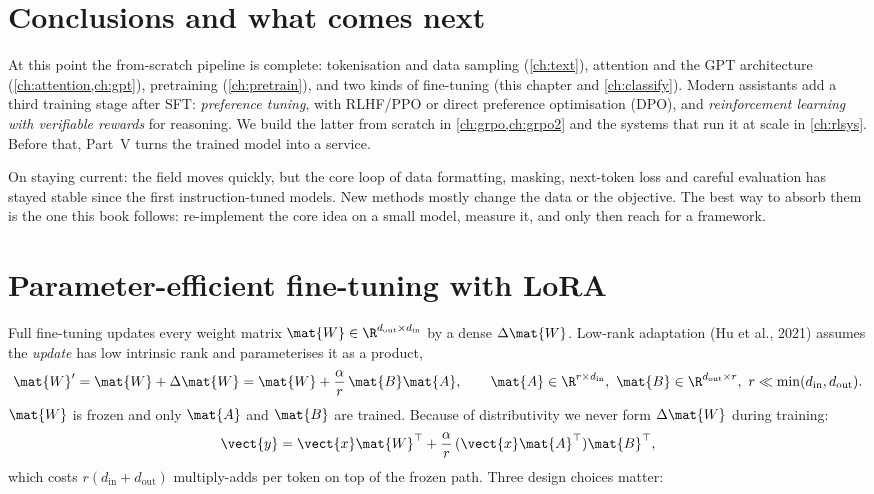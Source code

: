 \section{Conclusions and what comes next}\label{sec:instruct:conclusions}

At this point the from-scratch pipeline is complete: tokenisation and data sampling
(\cref{ch:text}), attention and the GPT architecture (\cref{ch:attention,ch:gpt}),
pretraining (\cref{ch:pretrain}), and two kinds of fine-tuning (this chapter and
\cref{ch:classify}). Modern assistants add a third training stage after SFT:
\emph{preference tuning}, with RLHF/PPO or direct preference optimisation (DPO), and
\emph{reinforcement learning with verifiable rewards} for reasoning. We build the
latter from scratch in \cref{ch:grpo,ch:grpo2} and the systems that run it at scale in
\cref{ch:rlsys}. Before that, Part~V turns the trained model into a service.

On staying current: the field moves quickly, but the core loop of data formatting,
masking, next-token loss and careful evaluation has stayed stable since the first
instruction-tuned models. New methods mostly change the data or the objective. The
best way to absorb them is the one this book follows: re-implement the core idea on a
small model, measure it, and only then reach for a framework.

\section{Parameter-efficient fine-tuning with LoRA}\label{sec:instruct:lora}

Full fine-tuning updates every weight matrix $\mat{W}\in\R^{d_\text{out}\times d_\text{in}}$
by a dense $\Delta\mat{W}$. Low-rank adaptation (Hu et al., 2021) assumes the
\emph{update} has low intrinsic rank and parameterises it as a product,
\begin{equation}
\mat{W}' = \mat{W} + \Delta\mat{W} = \mat{W} + \frac{\alpha}{r}\,\mat{B}\mat{A},\qquad
\mat{A}\in\R^{r\times d_\text{in}},\ \mat{B}\in\R^{d_\text{out}\times r},\ r\ll\min(d_\text{in},d_\text{out}).
\label{eq:instruct:lora}
\end{equation}
$\mat{W}$ is frozen and only $\mat{A}$ and $\mat{B}$ are trained. Because of
distributivity we never form $\Delta\mat{W}$ during training:
\begin{equation}
\vect{y} = \vect{x}\mat{W}^\top + \frac{\alpha}{r}\,(\vect{x}\mat{A}^\top)\mat{B}^\top,
\end{equation}
which costs $r(d_\text{in}+d_\text{out})$ multiply-adds per token on top of the frozen
path. Three design choices matter:

